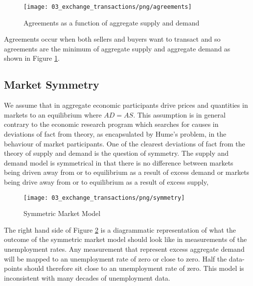 \begin{figure}[H]
\centering
\texttt{[image: 03\_exchange\_transactions/png/agreements]}
\caption{Agreements as a function of aggregate supply and demand}
\label{fig:agreements}
\end{figure}

Agreements occur when both sellers and buyers want to transact and so agreements are the minimum of
aggregate supply and aggregate demand as shown in Figure \ref{fig:agreements}.

\subsection{Market Symmetry}

We assume that in aggregate economic participants drive prices and quantities in markets to an
equilibrium where $AD = AS$. This assumption is in general contrary to the economic research program
which searches for causes in deviations of fact from theory, as encapsulated by Hume's problem, in
the behaviour of market participants. One of the clearest deviations of fact from the theory of
supply and demand is the question of symmetry. The supply and demand model is symmetrical in that
there is no difference between markets being driven away from or to equilibrium as a result of
excess demand or markets being drive away from or to equilibrium as a result of excess supply, 

\begin{figure}[H]
\centering
\texttt{[image: 03\_exchange\_transactions/png/symmetry]}
\caption{Symmetric Market Model}
\label{fig:symmetric_market_model}
\end{figure}

The right hand side of Figure \ref{fig:symmetric_market_model} is a diagrammatic representation of
what the outcome of the symmetric market model should look like in measurements of the unemployment
rates. Any measurement that represent excess aggregate demand will be mapped to an unemployment rate
of zero or close to zero. Half the data-points should therefore sit close to an unemployment rate of
zero. This model is inconsistent with many decades of unemployment data.
